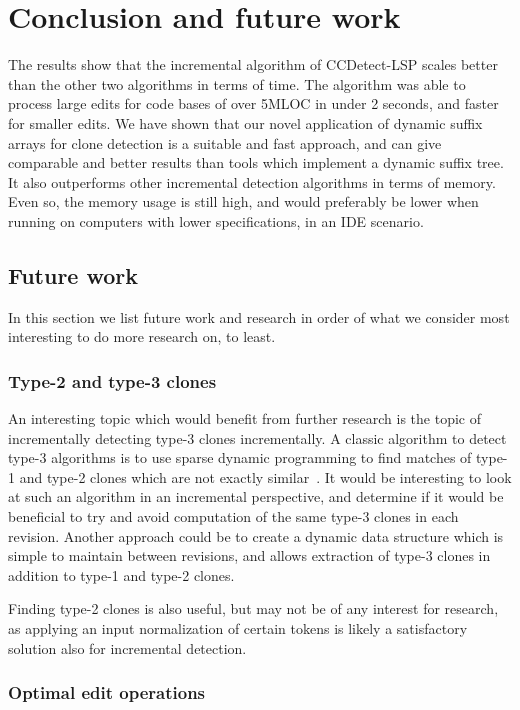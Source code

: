 \chapter{Conclusion and future work}

The results show that the incremental algorithm of CCDetect-LSP scales better than the
other two algorithms in terms of time. The algorithm was able to process large edits for
code bases of over 5MLOC in under 2 seconds, and faster for smaller edits. We have shown
that our novel application of dynamic suffix arrays for clone detection is a suitable and
fast approach, and can give comparable and better results than tools which implement a
dynamic suffix tree. It also outperforms other incremental detection algorithms in terms
of memory. Even so, the memory usage is still high, and would preferably be lower when
running on computers with lower specifications, in an IDE scenario. 

\section{Future work}

In this section we list future work and research in order of what we consider
most interesting to do more research on, to least.

\subsection*{Type-2 and type-3 clones}

An interesting topic which would benefit from further research is the topic of
incrementally detecting type-3 clones incrementally. A classic algorithm to detect type-3
algorithms is to use sparse dynamic programming to find matches of type-1 and type-2
clones which are not exactly similar~\cite{BakerSparseDynamicProgramming}. It would be
interesting to look at such an algorithm in an incremental perspective, and determine if
it would be beneficial to try and avoid computation of the same type-3 clones in each
revision. Another approach could be to create a dynamic data structure which is simple to
maintain between revisions, and allows extraction of type-3 clones in addition to type-1
and type-2 clones.

Finding type-2 clones is also useful, but may not be of any interest for research, as
applying an input normalization of certain tokens is likely a satisfactory solution also
for incremental detection.

\subsection*{Optimal edit operations}

